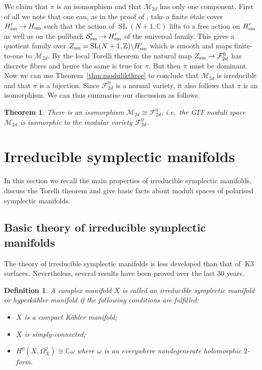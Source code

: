 \documentclass[a4paper,11pt]{article}
\newtheorem{theorem}[lemma]{Theorem}
\newtheorem{definition}[lemma]{Definition}
\newcommand{\CC}{\mathbb C}
\newcommand{\ZZ}{\mathbb Z}
\newcommand{\cF}{\mathcal F}
\newcommand{\cM}{\mathcal M}
\newcommand{\cS}{\mathcal S}
\newcommand{\SL}{\mathop{\mathrm {SL}}\nolimits}
\newcommand{\sm}{\mathop{\null\mathrm {sm}}\nolimits}
\newcommand{\Kthree}{\mathop{\mathrm {K3}}\nolimits}
\begin{document}
We claim that $\pi$ is an isomorphism and that $\cM_{2d}$ has only one
component.  First of all we note that one can, as in the proof of
\cite[Theorem~1.5]{GHSsymp}, take a finite \'etale cover $H'_{\sm} \to
H_{\sm}$ such that the action of $\SL(N+1,\CC)$ lifts to a free action
on $H'_{\sm}$ as well as on the pullback $\cS'_{\sm} \to H'_{\sm}$ of
the universal family.  This gives a quotient family over
$Z_{\sm}=\SL(N+1,\ZZ) \backslash H'_{\sm}$ which is smooth and maps
finite-to-one to $\cM_{2d}$.  By the local Torelli theorem the natural
map $Z_{\sm} \to \cF^0_{2d}$ has discrete fibres and hence the same
is true for $\pi$. But then $\pi$ must be dominant. Now we can use
Theorem~\ref{thm:modulikthree} to conclude that $\cM_{2d}$ is
irreducible and that $\pi$ is a bijection. Since $\cF^0_{2d}$ is a
normal variety, it also follows that $\pi$ is an isomorphism.  We can
thus summarise our discussion as follows.
\begin{theorem}\label{thm:gitperiods}
There is an isomorphism $\cM_{2d} \cong \cF^0_{2d}$, i.e.\ the GIT
moduli space $\cM_{2d}$ is isomorphic to the modular variety
$\cF^0_{2d}$.
\end{theorem}

\section{Irreducible symplectic manifolds}\label{sect:irrsymplectic}

In this section we recall the main properties of irreducible
symplectic manifolds, discuss the Torelli theorem and give basic facts
about moduli spaces of polarised symplectic manifolds.

\subsection{Basic theory of irreducible symplectic manifolds}\label{subsect:irrsymplecticbasic}

The theory of irreducible symplectic manifolds is less
developed than that of $\Kthree$ surfaces. Nevertheless, several
results have been proved over the last $30$ years.
\begin{definition}\label{def:irrsymplectic}
  A complex manifold $X$ is called an \emph{irreducible symplectic
    manifold} or \emph{hyperk\"ahler manifold} if the following
  conditions are fulfilled:
\begin{itemize}
\item[{\rm (i)}] $X$ is a compact K\"ahler manifold;
\item[{\rm (ii)}] $X$ is simply-connected;
\item[{\rm (iii)}] $H^0(X,\Omega^2_X) \cong \CC \omega$ where $\omega$
  is an everywhere nondegenerate holomorphic $2$-form.
\end{itemize}
\end{definition}
\end{document}
